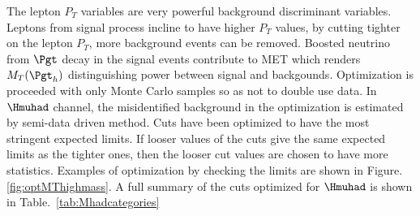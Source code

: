  The lepton $P_{T}$ variables are very powerful background discriminant variables. Leptons from signal process incline to have higher $P_{T}$ values, by cutting tighter on the lepton $P_{T}$, more background events can be removed. Boosted neutrino from $\Pgt$ decay in the signal events contribute to MET which renders $M_{T}(\Pgt_{h})$ distinguishing power between signal and backgounds. Optimization is proceeded with only Monte Carlo samples so as not to double use data. In $\Hmuhad$  channel, the misidentified background in the optimization is estimated by semi-data driven method. Cuts have been optimized to have the most stringent expected limits. If looser values of the cuts give the same expected limits as the tighter ones, then the looser cut values are chosen to have more statistics. Examples of optimization by checking the limits are shown in Figure. \ref{fig:optMThighmass}. A full summary of the cuts optimized for $\Hmuhad$ is shown in Table.~\ref{tab:Mhadcategories}


